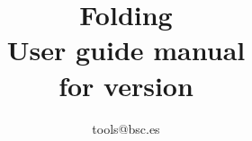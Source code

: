 \documentclass[twoside,a4paper,english,11pt]{book}
\newcommand{\FOLDING}{\textsf{{F}olding}}
\begin{document}

\title{\FOLDING \\
       User guide manual\\
       for version \FOLDINGVERSION}
\author{
tools@bsc.es
}

\maketitle
\tableofcontents
\listoffigures
\listoftables





\end{document}
